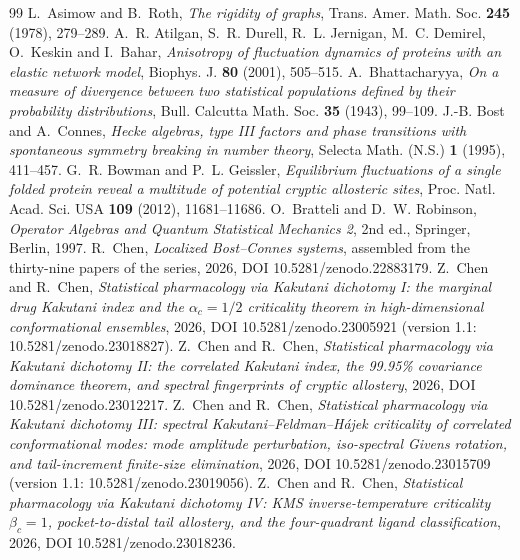 \documentclass[11pt,reqno]{amsart}
\theoremstyle{plain}
\theoremstyle{definition}
\theoremstyle{remark}
\numberwithin{equation}{section}
\begin{document}
\begin{thebibliography}{99}
 L.~Asimow and B.~Roth, \emph{The rigidity of graphs}, Trans. Amer. Math. Soc. \textbf{245} (1978), 279--289.
 A.~R. Atilgan, S.~R. Durell, R.~L. Jernigan, M.~C. Demirel, O.~Keskin and I.~Bahar, \emph{Anisotropy of fluctuation dynamics of proteins with an elastic network model}, Biophys. J. \textbf{80} (2001), 505--515.
 A.~Bhattacharyya, \emph{On a measure of divergence between two statistical populations defined by their probability distributions}, Bull. Calcutta Math. Soc. \textbf{35} (1943), 99--109.
 J.-B. Bost and A.~Connes, \emph{Hecke algebras, type III factors and phase transitions with spontaneous symmetry breaking in number theory}, Selecta Math. (N.S.) \textbf{1} (1995), 411--457.
 G.~R. Bowman and P.~L. Geissler, \emph{Equilibrium fluctuations of a single folded protein reveal a multitude of potential cryptic allosteric sites}, Proc. Natl. Acad. Sci. USA \textbf{109} (2012), 11681--11686.
 O.~Bratteli and D.~W. Robinson, \emph{Operator Algebras and Quantum Statistical Mechanics 2}, 2nd ed., Springer, Berlin, 1997.
 R.~Chen, \emph{Localized Bost--Connes systems}, assembled from the thirty-nine papers of the series, 2026, DOI 10.5281/zenodo.22883179.
 Z.~Chen and R.~Chen, \emph{Statistical pharmacology via Kakutani dichotomy I: the marginal drug Kakutani index and the $\alpha_c=1/2$ criticality theorem in high-dimensional conformational ensembles}, 2026, DOI 10.5281/zenodo.23005921 (version 1.1: 10.5281/zenodo.23018827).
 Z.~Chen and R.~Chen, \emph{Statistical pharmacology via Kakutani dichotomy II: the correlated Kakutani index, the 99.95\% covariance dominance theorem, and spectral fingerprints of cryptic allostery}, 2026, DOI 10.5281/zenodo.23012217.
 Z.~Chen and R.~Chen, \emph{Statistical pharmacology via Kakutani dichotomy III: spectral Kakutani--Feldman--H\'ajek criticality of correlated conformational modes: mode amplitude perturbation, iso-spectral Givens rotation, and tail-increment finite-size elimination}, 2026, DOI 10.5281/zenodo.23015709 (version 1.1: 10.5281/zenodo.23019056).
 Z.~Chen and R.~Chen, \emph{Statistical pharmacology via Kakutani dichotomy IV: KMS inverse-temperature criticality $\beta_c=1$, pocket-to-distal tail allostery, and the four-quadrant ligand classification}, 2026, DOI 10.5281/zenodo.23018236.

\end{thebibliography}
\end{document}
